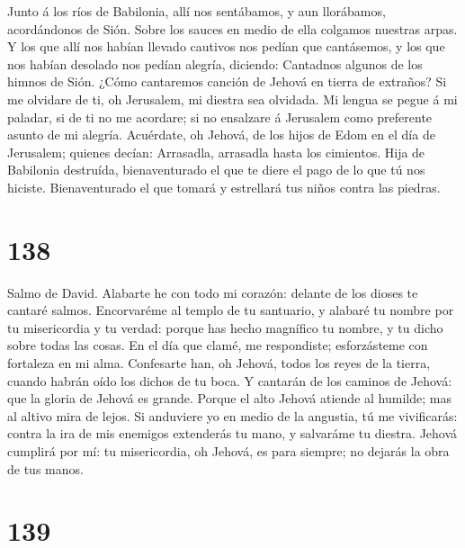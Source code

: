  Junto á los ríos de Babilonia, allí nos sentábamos, y aun
llorábamos, acordándonos de Sión.  Sobre los sauces en
medio de ella colgamos nuestras arpas.  Y los que allí nos
habían llevado cautivos nos pedían que cantásemos, y los que nos habían
desolado nos pedían alegría, diciendo:  Cantadnos algunos
de los himnos de Sión. ¿Cómo cantaremos canción de Jehová en tierra de
extraños?  Si me olvidare de ti, oh Jerusalem, mi diestra
sea olvidada.  Mi lengua se pegue á mi paladar, si de ti
no me acordare; si no ensalzare á Jerusalem como preferente asunto de mi
alegría.  Acuérdate, oh Jehová, de los hijos de Edom en el
día de Jerusalem; quienes decían: Arrasadla, arrasadla hasta los
cimientos.  Hija de Babilonia destruída, bienaventurado el
que te diere el pago de lo que tú nos hiciste. 
Bienaventurado el que tomará y estrellará tus niños contra las piedras.

\hypertarget{section-137}{%
\section{138}\label{section-137}}

 Salmo de David. Alabarte he con todo mi corazón: delante
de los dioses te cantaré salmos.  Encorvaréme al templo de
tu santuario, y alabaré tu nombre por tu misericordia y tu verdad:
porque has hecho magnífico tu nombre, y tu dicho sobre todas las cosas.
 En el día que clamé, me respondiste; esforzásteme con
fortaleza en mi alma.  Confesarte han, oh Jehová, todos
los reyes de la tierra, cuando habrán oído los dichos de tu boca.
 Y cantarán de los caminos de Jehová: que la gloria de
Jehová es grande.  Porque el alto Jehová atiende al
humilde; mas al altivo mira de lejos.  Si anduviere yo en
medio de la angustia, tú me vivificarás: contra la ira de mis enemigos
extenderás tu mano, y salvaráme tu diestra.  Jehová
cumplirá por mí: tu misericordia, oh Jehová, es para siempre; no dejarás
la obra de tus manos.

\hypertarget{section-138}{%
\section{139}\label{section-138}}

